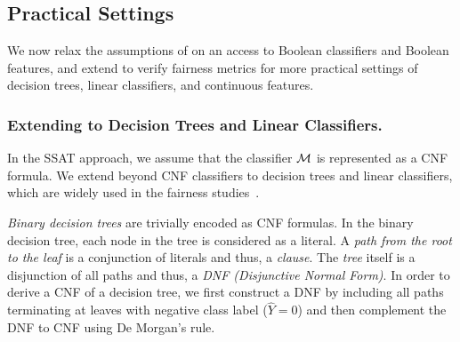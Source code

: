 \subsection{Practical Settings}
\label{sec:practical-setting}
We now relax the assumptions of {\justicia} on an access to Boolean classifiers and Boolean features, and extend {\justicia} to verify fairness metrics for more practical settings of decision trees, linear classifiers, and continuous features.

\subsubsection{Extending {\justicia} to Decision Trees and Linear Classifiers. }
In the SSAT approach, we assume that the classifier $\mathcal{M}$ is represented as a CNF formula.  
We extend {\justicia} beyond CNF classifiers to decision trees and linear classifiers, which are widely used in the fairness studies~\cite{zemel2013learning,raff2018fair,zhang2019faht}.

\textit{Binary decision trees} are trivially encoded as  CNF formulas.  In the binary decision tree, each node in the tree is considered as a literal. A \textit{path from the root to the leaf} is a conjunction of literals and thus, a \textit{clause}. The \textit{tree} itself is a disjunction of all paths and thus, a \textit{DNF (Disjunctive Normal Form)}. In order to derive a CNF of a decision tree, we first construct a DNF by including all paths terminating at leaves with negative class label ($ \widehat{Y} = 0 $) and then complement the DNF to CNF using De Morgan's rule. 

